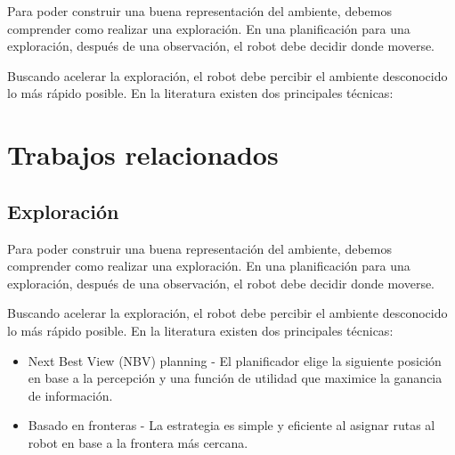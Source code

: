 Para poder construir una buena representación del ambiente, debemos comprender como realizar una exploración. En una planificación para una exploración, después de una observación, el robot debe decidir donde moverse.

Buscando acelerar la exploración, el robot debe percibir el ambiente desconocido lo más rápido posible. En la literatura existen dos principales técnicas:

\section{Trabajos relacionados} \label{}

\subsection{Exploración}

Para poder construir una buena representación del ambiente, debemos comprender como realizar una exploración. En una planificación para una exploración, después de una observación, el robot debe decidir donde moverse.

Buscando acelerar la exploración, el robot debe percibir el ambiente desconocido lo más rápido posible. En la literatura existen dos principales técnicas:

\begin{itemize}\setlength{\itemsep}{-1mm}
\item Next Best View (NBV) planning - El planificador elige la siguiente posición en base a la percepción y una función de utilidad que maximice la ganancia de información. 
\item Basado en fronteras - La estrategia es simple y eficiente al asignar rutas al robot en base a la frontera más cercana.
\end{itemize}



